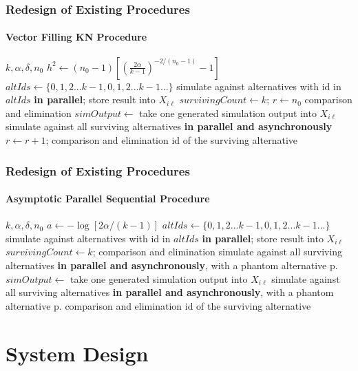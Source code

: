 \documentclass{beamer}
\begin{document}
\begin{frame}
\frametitle{Redesign of Existing Procedures}
\framesubtitle{Vector Filling KN Procedure}
\begin{algorithmic}[1]
\Require $k, \alpha, \delta, n_0$
\State $h^2 \gets (n_0 -1)[(\frac{2\alpha}{k - 1})^{-2/(n_0-1)} - 1]$
\State $altIds \gets \{0, 1, 2...k - 1, 0, 1, 2...k - 1...\}$ 
\State simulate against alternatives with id in $altIds$ \textbf{in parallel}; store result into $X_{i\ell}$
\State $survivingCount \gets k$; $r \gets n_0$
\State comparison and elimination
  \State $simOutput \gets $ take one generated simulation output into $X_{i\ell}$
  \State simulate against all surviving alternatives \textbf{in parallel and asynchronously}
    \State $r \gets r + 1$; comparison and elimination
  \EndIf
\EndWhile
\State \Return id of the surviving alternative
\end{algorithmic}
\end{frame}

\begin{frame}
\frametitle{Redesign of Existing Procedures}
\framesubtitle{Asymptotic Parallel Sequential Procedure}
\begin{algorithmic}[1]
\Require $k, \alpha, \delta, n_0$
\State $a \gets - \log{[2\alpha / (k - 1)]}$
\State $altIds \gets \{0, 1, 2...k - 1, 0, 1, 2...k - 1...\}$ 
\State simulate against alternatives with id in $altIds$ \textbf{in parallel}; store result into $X_{i\ell}$
\State $survivingCount \gets k$; comparison and elimination
\State simulate against all surviving alternatives \textbf{in parallel and asynchronously}, with a phantom alternative p.
  \State $simOutput \gets $ take one generated simulation output into $X_{i\ell}$
    \State simulate against all surviving alternatives \textbf{in parallel and asynchronously}, with a phantom alternative p.
    \State comparison and elimination
  \EndIf
\EndWhile
\State \Return id of the surviving alternative
\end{algorithmic}
\end{frame}

\section{System Design}
\end{document}
